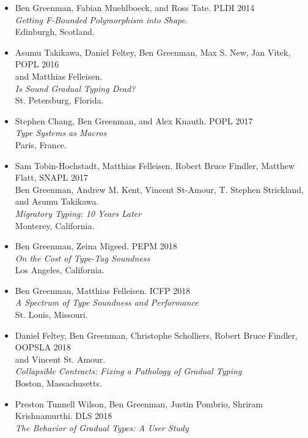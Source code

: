 \documentclass{article}
\begin{document}
\begin{itemize}
\item
  Ben Greenman, Fabian Muehlboeck, and Ross Tate. \hfill PLDI 2014 \\
  \emph{Getting F-Bounded Polymorphism into Shape}. \\
  Edinburgh, Scotland.
\item
  Asumu Takikawa, Daniel Feltey, Ben Greenman, Max S. New, Jan Vitek, \hfill POPL 2016 \\
   and Matthias Felleisen. \\
   \emph{Is Sound Gradual Typing Dead?} \\
  St. Petersburg, Florida.
\item
  Stephen Chang, Ben Greenman, and Alex Knauth. \hfill POPL 2017 \\
   \emph{Type Systems as Macros} \\
  Paris, France.
\item
  Sam Tobin-Hochstadt, Matthias Felleisen, Robert Bruce Findler, Matthew Flatt, \hfill SNAPL 2017 \\
  Ben Greenman, Andrew M. Kent, Vincent St-Amour, T. Stephen Strickland, \\
  and Asumu Takikawa. \\
  \emph{Migratory Typing: 10 Years Later} \\
  Monterey, California.
\item
  Ben Greenman, Zeina Migeed. \hfill PEPM 2018 \\
  \emph{On the Cost of Type-Tag Soundness} \\
  Los Angeles, California.
\item
  Ben Greenman, Matthias Felleisen. \hfill ICFP 2018 \\
  \emph{A Spectrum of Type Soundness and Performance} \\
  St. Louis, Missouri.
\item
  Daniel Feltey, Ben Greenman, Christophe Scholliers, Robert Bruce Findler, \hfill OOPSLA 2018 \\
  and Vincent St. Amour. \\
  \emph{Collapsible Contracts: Fixing a Pathology of Gradual Typing} \\
  Boston, Massachusetts.
\item
  Preston Tunnell Wilson, Ben Greenman, Justin Pombrio, Shriram Krishnamurthi. \hfill DLS 2018 \\
  \emph{The Behavior of Gradual Types: A User Study} \\

\end{itemize}
\end{document}
